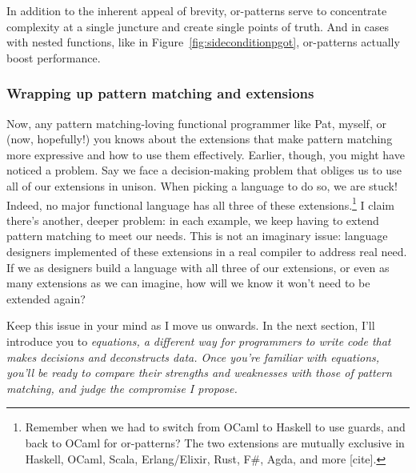 \documentclass[manuscript,screen,review, 12pt]{acmart}
\begin{document}
\begin{outline}[enumerate]
    In addition to the inherent appeal of brevity, or-patterns serve to
    concentrate complexity at a single juncture and create single points of
    truth. And in cases with nested functions, like in
    Figure~\ref{fig:sideconditionpgot}, or-patterns actually boost performance.
    
    
    \subsubsection{Wrapping up pattern matching and extensions}
    Now, any pattern matching-loving functional programmer like Pat, myself, or
    (now, hopefully!) you knows about the extensions that make pattern matching
    more expressive and how to use them effectively. Earlier, though, you might
    have noticed a problem. Say we face a decision-making problem that obliges
    us to use all of our extensions in unison. When picking a language to do so,
    we are stuck! Indeed, no major functional language has all three of these
    extensions.\footnote{Remember when we had to switch from OCaml to Haskell to
    use guards, and back to OCaml for or-patterns? The two extensions are
    mutually exclusive in Haskell, OCaml, Scala, Erlang/Elixir, Rust, F\#, Agda,
    and more [cite].} I claim there's another, deeper problem: in each example,
    we keep having to extend pattern matching to meet our needs. This is not an
    imaginary issue: language designers implemented of these extensions in a
    real compiler to address real need. If we as designers build a language with
    all three of our extensions, or even as many extensions as we can imagine,
    how will we know it won't need to be extended again? 


    Keep this issue in your mind as I move us onwards. In the next section, I'll
    introduce you to \it{equations}, a different way for programmers to write
    code that makes decisions and deconstructs data. Once you're familiar with
    equations, you'll be ready to compare their strengths and weaknesses with
    those of pattern matching, and judge the compromise I propose.
    

\end{outline}
\end{document}
